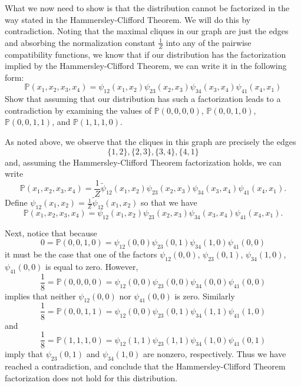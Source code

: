\documentclass{article}
\begin{document}
\begin{homeworkProblem}
What we now need to show is that the distribution cannot be factorized in the
way stated in the Hammersley-Clifford Theorem. We will do this by contradiction.
Noting that the maximal cliques in our graph are just the edges and absorbing
the normalization constant $ \frac{1}{Z} $ into any of the pairwise
compatibility functions, we know that if our distribution has the factorization
implied by the Hammersley-Clifford Theorem, we can write it in the following
form:
\[
  \mathbb{P}(x_1,x_2,x_3,x_4) = \psi_{12}(x_1,x_2)\psi_{23}(x_2,x_3)\psi_{34}(x_3,x_4)\psi_{41}(x_4,x_1)
\]
Show that assuming that our distribution has such a factorization leads to a
contradiction by examining the values of $ \mathbb{P}(0,0,0,0)$,
 $\mathbb{P}(0,0,1,0)$, $\mathbb{P}(0,0,1,1)$, and $\mathbb{P}(1,1,1,0)$.

\solution

As noted above, we observe that the cliques in this graph are precisely the
edges
\[\{1,2\}, \{2,3\}, \{3,4\}, \{4,1\}\]
and, assuming the Hammersley-Clifford Theorem factorization holds, we can write
\[ \mathbb{P}(x_1, x_2, x_3, x_4)
= \frac{1}{Z}
\widetilde{\psi}_{12}(x_1,x_2)\psi_{23}(x_2,x_3)\psi_{34}(x_3,x_4)\psi_{41}(x_4,x_1).\]
Define $\psi_{12}(x_1,x_2) = \frac{1}{Z}\widetilde{\psi}_{12}(x_1,x_2)$
so that we have
\[ \mathbb{P}(x_1, x_2, x_3, x_4)
= \psi_{12}(x_1,x_2)\psi_{23}(x_2,x_3)\psi_{34}(x_3,x_4)\psi_{41}(x_4,x_1).\]

Next, notice that because
\[0 = \mathbb{P}(0,0,1,0) =
  \psi_{12}(0,0)\psi_{23}(0,1)\psi_{34}(1,0)\psi_{41}(0,0)
\]
it must be the case that one of the factors
$\psi_{12}(0,0)$, $\psi_{23}(0,1)$, $\psi_{34}(1,0)$, $\psi_{41}(0,0)$ is
equal to zero. However,
\[ \frac{1}{8} = \mathbb{P}(0,0,0,0) =
  \psi_{12}(0,0)\psi_{23}(0,0)\psi_{34}(0,0)\psi_{41}(0,0)
\]
implies that neither $\psi_{12}(0,0)$ nor $\psi_{41}(0,0)$ is zero. Similarly
\[ \frac{1}{8} = \mathbb{P}(0,0,1,1) =
  \psi_{12}(0,0)\psi_{23}(0,1)\psi_{34}(1,1)\psi_{41}(1,0)
\]
and
\[ \frac{1}{8} = \mathbb{P}(1,1,1,0) =
  \psi_{12}(1,1)\psi_{23}(1,1)\psi_{34}(1,0)\psi_{41}(0,1)
\]
imply that $\psi_{23}(0,1)$ and $\psi_{34}(1,0)$ are nonzero, respectively. Thus
we have reached a contradiction, and conclude that the Hammersley-Clifford
Theorem factorization does not hold for this distribution.

\end{homeworkProblem}
\end{document}
